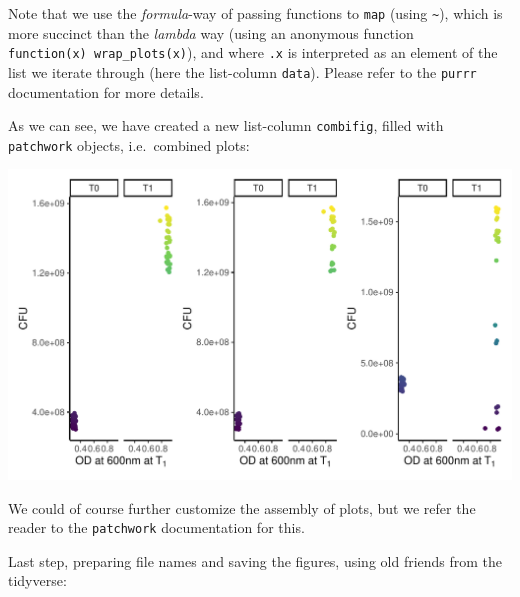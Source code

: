 \documentclass[]{book}
\newenvironment{Shaded}{}{}
\newcommand{\DecValTok}[1]{\textcolor[rgb]{0.25,0.63,0.44}{#1}}
\newcommand{\NormalTok}[1]{#1}
\newcommand{\OperatorTok}[1]{\textcolor[rgb]{0.40,0.40,0.40}{#1}}
\begin{document}
Note that we use the \emph{formula}-way of passing functions to \texttt{map} (using \texttt{\textasciitilde{}}), which is more succinct than the \emph{lambda} way (using an anonymous function \texttt{function(x)\ wrap\_plots(x)}), and where \texttt{.x} is interpreted as an element of the list we iterate through (here the list-column \texttt{data}). Please refer to the \texttt{purrr} documentation for more details.

As we can see, we have created a new list-column \texttt{combifig}, filled with \texttt{patchwork} objects, i.e.~combined plots:

\begin{Shaded}
\end{Shaded}

\begin{center}\includegraphics[width=\textwidth]{TRES-Tidy-Tutorial_files/figure-latex/unnamed-chunk-158-1} \end{center}

We could of course further customize the assembly of plots, but we refer the reader to the \texttt{patchwork} documentation for this.

Last step, preparing file names and saving the figures, using old friends from the tidyverse:
\end{document}
